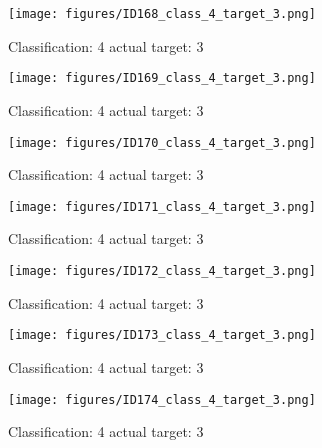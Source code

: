 \begin{figure}[h!]
\begin{center}
\texttt{[image: figures/ID168\_class\_4\_target\_3.png]}
\end{center}
\caption{ Classification: 4 actual target: 3}
\label{fig:ID168_class_4_target_3}
\end{figure}
\begin{figure}[h!]
\begin{center}
\texttt{[image: figures/ID169\_class\_4\_target\_3.png]}
\end{center}
\caption{ Classification: 4 actual target: 3}
\label{fig:ID169_class_4_target_3}
\end{figure}
\begin{figure}[h!]
\begin{center}
\texttt{[image: figures/ID170\_class\_4\_target\_3.png]}
\end{center}
\caption{ Classification: 4 actual target: 3}
\label{fig:ID170_class_4_target_3}
\end{figure}
\begin{figure}[h!]
\begin{center}
\texttt{[image: figures/ID171\_class\_4\_target\_3.png]}
\end{center}
\caption{ Classification: 4 actual target: 3}
\label{fig:ID171_class_4_target_3}
\end{figure}
\begin{figure}[h!]
\begin{center}
\texttt{[image: figures/ID172\_class\_4\_target\_3.png]}
\end{center}
\caption{ Classification: 4 actual target: 3}
\label{fig:ID172_class_4_target_3}
\end{figure}
\begin{figure}[h!]
\begin{center}
\texttt{[image: figures/ID173\_class\_4\_target\_3.png]}
\end{center}
\caption{ Classification: 4 actual target: 3}
\label{fig:ID173_class_4_target_3}
\end{figure}
\begin{figure}[h!]
\begin{center}
\texttt{[image: figures/ID174\_class\_4\_target\_3.png]}
\end{center}
\caption{ Classification: 4 actual target: 3}
\label{fig:ID174_class_4_target_3}
\end{figure}
